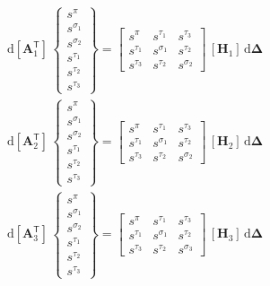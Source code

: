 \begin{equation}
\begin{aligned}
 & \mathrm{d} [\mathbf{A}_1^{\mathsf{T}}] \, \begin{Bmatrix} s^{\pi} \\ s^{\sigma_1} \\ s^{\sigma_2} \\ s^{\tau_1} \\ s^{\tau_2} \\ s^{\tau_3}  \end{Bmatrix} = 
\begin{bmatrix}s^{\pi} & s^{\tau_1} & s^{\tau_3}\\ 
s^{\tau_1} & s^{\sigma_1} & s^{\tau_2} \\ 
s^{\tau_3} & s^{\tau_2} & s^{\sigma_2} \end{bmatrix} \, [\mathbf{H}_1] \, \mathrm{d} \boldsymbol{\Delta} \\
& \mathrm{d} [\mathbf{A}_2^{\mathsf{T}}] \, \begin{Bmatrix}s^{\pi} \\ s^{\sigma_1} \\ s^{\sigma_2}  \\ s^{\tau_1} \\ s^{\tau_2} \\ s^{\tau_3}  \end{Bmatrix} = 
 \begin{bmatrix} s^{\pi} & s^{\tau_1} & s^{\tau_3}\\ 
 s^{\tau_1} & s^{\sigma_1} & s^{\tau_2} \\ 
 s^{\tau_3} & s^{\tau_2} & s^{\sigma_2}  \end{bmatrix} \, [\mathbf{H}_2] \, \mathrm{d} \boldsymbol{\Delta}\\
 & \mathrm{d} [\mathbf{A}_3^{\mathsf{T}}] \, \begin{Bmatrix}s^{\pi} \\ s^{\sigma_1} \\ s^{\sigma_2}  \\ s^{\tau_1} \\ s^{\tau_2} \\ s^{\tau_3}  \end{Bmatrix} = 
 \begin{bmatrix} s^{\pi} & s^{\tau_1} & s^{\tau_3}\\ 
 s^{\tau_1} & s^{\sigma_1} & s^{\tau_2} \\ 
 s^{\tau_3} & s^{\tau_2} & s^{\sigma_3}  \end{bmatrix} \, [\mathbf{H}_3] \, \mathrm{d} \boldsymbol{\Delta}
 \end{aligned}
\end{equation}
